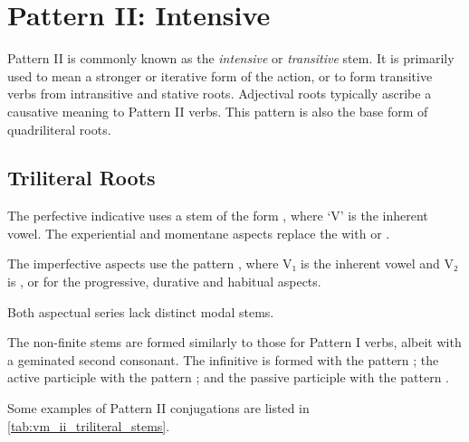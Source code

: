 \documentclass[grammar]{subfiles}
\begin{document}
\clearpage
\section{Pattern II: Intensive}
\label{sec:vm_pattern_ii}

Pattern II is commonly known as the \emph{intensive} or \emph{transitive} stem.
It is primarily used to mean a stronger or iterative form of the action, or to
form transitive verbs from intransitive and stative roots.  Adjectival roots
typically ascribe a causative meaning to Pattern II verbs.  This pattern is
also the base form of quadriliteral roots. 


%



\subsection{Triliteral Roots}
\label{ssec:vm_ii_triliteral}

The perfective indicative uses a stem of the form , where ‘V’ is
the inherent vowel.  The experiential and momentane aspects replace the 
with  or .  

The imperfective aspects use the pattern , where V₁ is the
inherent vowel and V₂ is ,  or  for the progressive,
durative and habitual aspects. 

Both aspectual series lack distinct modal stems.

The non-finite stems are formed similarly to those for Pattern I verbs, albeit
with a geminated second consonant.  The infinitive is formed with the pattern
; the active participle with the pattern ; and
the passive participle with the pattern .

Some examples of Pattern II conjugations are listed in \cref{tab:vm_ii_triliteral_stems}.
\end{document}
